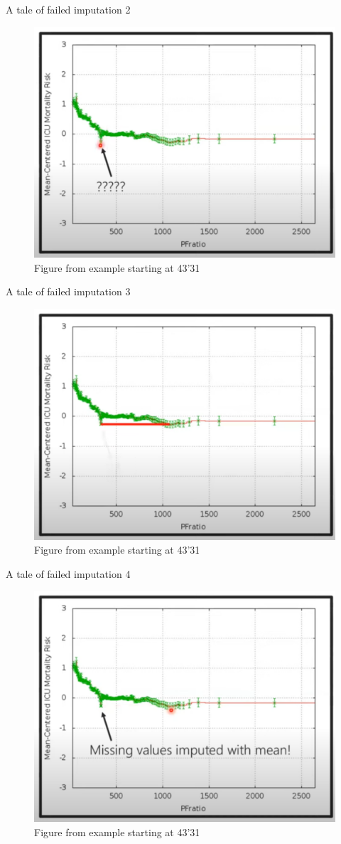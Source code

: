 \documentclass[11pt,compress,t,notes=noshow, xcolor=table]{beamer}
\begin{document}
\begin{frame}{A tale of failed imputation 2}
\vfill
\begin{figure}
    \centering
    \includegraphics[width=0.5\linewidth]{figure_man/Screenshot from 2025-06-03 22-38-27.png}
    \caption{Figure from  example starting at 43'31}
\end{figure}
\vfill    
\end{frame}

\begin{frame}{A tale of failed imputation 3}
\vfill
\begin{figure}
    \centering
    \includegraphics[width=0.5\linewidth]{figure_man/Screenshot from 2025-06-03 22-38-34.png}
    \caption{Figure from  example starting at 43'31}
\end{figure}
\vfill
\end{frame}

\begin{frame}{A tale of failed imputation 4}
\vfill
\begin{figure}
    \centering
    \includegraphics[width=0.5\linewidth]{figure_man/Screenshot from 2025-06-03 22-38-41.png}
    \caption{Figure from  example starting at 43'31}
\end{figure}
\vfill
\end{frame}
\end{document}
